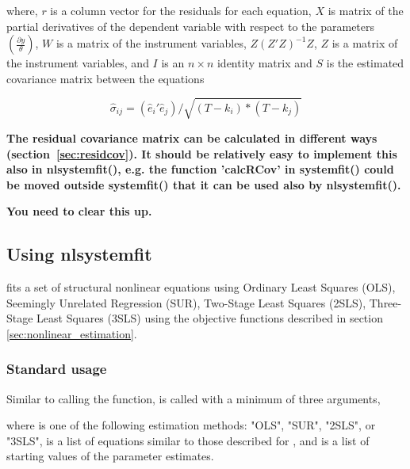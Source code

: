 where, $r$ is a column vector for the residuals for each equation,
$X$ is matrix of the partial derivatives of the dependent variable 
with respect to the parameters $\left( \frac{ \partial y }{ \theta} \right)$,
$W$ is a matrix of the instrument variables, $Z(Z'Z)^{-1}Z$, $Z$ is a
matrix of the instrument variables, and $I$ is an $n \times n $
identity matrix and $S$ is the estimated covariance matrix between the
equations

\begin{equation}
  \label{eq:non-linear_varcov}
  \hat{\sigma}_{ij} = (\hat{e}_i' \hat{e}_j) / \sqrt{(T - k_i)*(T- k_j)} 
\end{equation}

\textbf{The residual covariance matrix can be calculated in
different ways (section~\ref{sec:residcov}). 
It should be relatively easy to implement this also in nlsystemfit(), 
e.g. the function 'calcRCov' in systemfit() could be moved outside
systemfit() that it can be used also by nlsystemfit().}

\textbf{You need to clear this up.}

\subsection{Using nlsystemfit}\label{sec:UsingnlSystemfit}

 fits a set of structural nonlinear equations using
Ordinary Least Squares (OLS), Seemingly Unrelated Regression (SUR),
Two-Stage Least Squares (2SLS), Three-Stage Least Squares (3SLS) using
the objective functions described in section
\ref{sec:nonlinear_estimation}.

\subsubsection{Standard usage}

Similar to calling the  function, 
is called with a minimum of three arguments,


where  is one of the following estimation methods: "OLS",
"SUR", "2SLS", or "3SLS",  is a list of equations similar
to those described for , and  is a list of
starting values of the parameter estimates.

